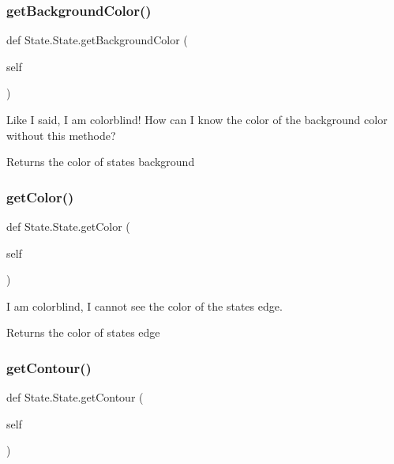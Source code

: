\subsubsection{\texorpdfstring{getBackgroundColor()}{getBackgroundColor()}}
{\footnotesize\ttfamily def State.\+State.\+get\+Background\+Color (\begin{DoxyParamCaption}\item[{}]{self }\end{DoxyParamCaption})}



Like I said, I am colorblind! How can I know the color of the background color without this methode? 

\begin{DoxyReturn}{Returns}
the color of state\textquotesingle{}s background 
\end{DoxyReturn}
\mbox{\label{classState_1_1State_ac432a1d641421836ccec98b421b82852}} 
\subsubsection{\texorpdfstring{getColor()}{getColor()}}
{\footnotesize\ttfamily def State.\+State.\+get\+Color (\begin{DoxyParamCaption}\item[{}]{self }\end{DoxyParamCaption})}



I am colorblind, I cannot see the color of the state\textquotesingle{}s edge. 

\begin{DoxyReturn}{Returns}
the color of state\textquotesingle{}s edge 
\end{DoxyReturn}
\mbox{\label{classState_1_1State_afa4bdf4fa0cb0c9644bf5b2777ebc876}} 
\subsubsection{\texorpdfstring{getContour()}{getContour()}}
{\footnotesize\ttfamily def State.\+State.\+get\+Contour (\begin{DoxyParamCaption}\item[{}]{self }\end{DoxyParamCaption})}



